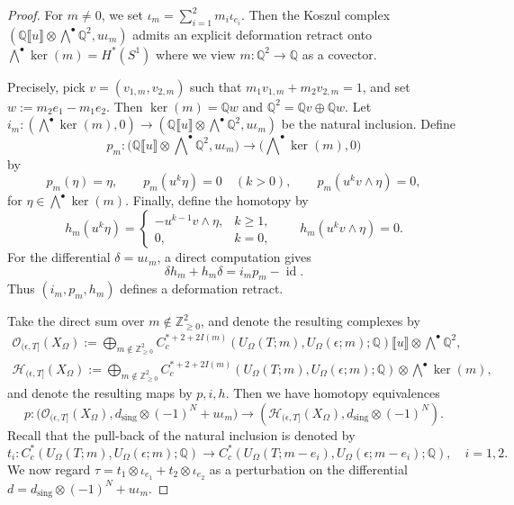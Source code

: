 \documentclass[11pt]{amsart}
\numberwithin{equation}{section}
\theoremstyle{plain}
\theoremstyle{definition}
\theoremstyle{remark}
\newcommand{\bQ} { {\mathbb{Q}}}
\newcommand{\bZ} { {\mathbb{Z}}}
\newcommand{\id}{{\operatorname{id}}}
\newcommand{\fpw}[1]{{\llbracket #1\rrbracket}}
\begin{document}
\begin{proof}For $m\neq 0$, we set $\iota_m=\sum_{i=1}^2 m_i\iota_{e_i}$. Then the Koszul complex $
\left(
\bQ\fpw{u}\otimes\bigwedge^\bullet \bQ^2,
u\iota_m
\right)
$
admits an explicit deformation retract onto $\bigwedge^\bullet \ker(m)= H^*(S^1)$ where we view $m: \bQ ^2 \to \bQ $ as a covector. 

Precisely, pick $v=(v_{1,m},v_{2,m} ) $ such that $m_1v_{1,m}+m_2v_{2,m}=1$, and set $w:=m_2e_1-m_1e_2$. Then $\ker(m)=\bQ w$ and $
\bQ^2=\bQ v\oplus \bQ w$.
Let $i_m:(\bigwedge^\bullet \ker(m),0)
\longrightarrow
(\bQ\fpw{u}\otimes\bigwedge^\bullet \bQ^2, u\iota_m)$ be the natural inclusion. 
Define
\[
p_m:
\Big(\bQ\fpw{u}\otimes\bigwedge\nolimits^\bullet \bQ^2, u\iota_m\Big)
\longrightarrow
\Big(\bigwedge\nolimits^\bullet \ker(m), 0\Big)
\]
by
\[
p_m(\eta)=\eta,
\qquad
p_m(u^k\eta)=0\quad (k>0),
\qquad
p_m(u^k v\wedge\eta)=0,
\]
for $\eta\in\bigwedge^\bullet\ker(m)$. 
Finally, define the homotopy by
\[
h_m(u^k\eta)
=
\begin{cases}
-u^{k-1}v \wedge\eta,&k\geq1,\\
0,&k=0,
\end{cases}
\qquad
h_m(u^k v \wedge\eta)=0.
\]
For the differential $\delta = u \iota_m$, a direct computation gives
\[
\delta h_m+h_m\delta
=
i_mp_m-\id.
\]
Thus $(i_m,p_m,h_m)$ defines a deformation retract.

Take the direct sum over $m \notin\bZ_{\geq0}^2$, and denote the resulting complexes by
\begin{gather*}
\mathcal{O}_{(\epsilon,T]}(X_\Omega):=\bigoplus_{m\notin\bZ_{\geq0}^2}
C^{*+2+2I(m)}_c({U_\Omega(T;m)},U_\Omega(\epsilon;m) ;\bQ  )\fpw{u}
\otimes\bigwedge\nolimits^\bullet \bQ^2,\\
\mathcal{H}_{(\epsilon,T]}(X_\Omega)
:=
\bigoplus_{m\notin\bZ_{\geq0}^2}
C^{*+2+2I(m)}_c({U_\Omega(T;m)},U_\Omega(\epsilon;m) ;\bQ  )
\otimes\bigwedge\nolimits^\bullet \ker(m),
\end{gather*}
and denote the resulting maps by $p,i,h$. Then we have homotopy equivalences
\[p: (\mathcal{O}_{(\epsilon,T]}(X_\Omega), d_{\mathrm{sing}}\otimes (-1)^N + u\iota_m\Big)
\longrightarrow 
(\mathcal{H}_{(\epsilon,T]}(X_\Omega), d_{\mathrm{sing}} \otimes (-1)^N).\]
Recall that the pull-back of the natural inclusion is denoted by
\[t_i: C^*_c({U_\Omega(T;m)},U_\Omega(\epsilon;m) ;\bQ  ) \to C^*_c({U_\Omega(T;m-e_i)},U_\Omega(\epsilon;m-e_i) ;\bQ  ), \quad i=1,2.\]
We now regard $\tau=t_1\otimes \iota_{e_1}+t_2\otimes \iota_{e_2}$ as a perturbation on the differential $d=d_{\mathrm{sing}} \otimes (-1)^N + u \iota_m$.  



\end{proof}
\end{document}
